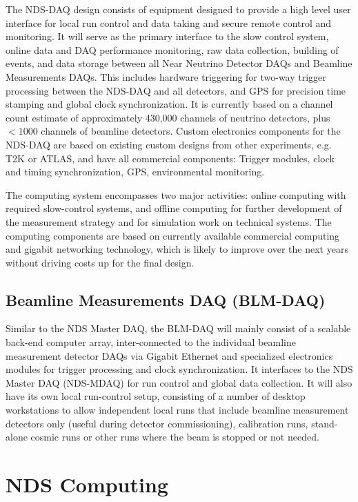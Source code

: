 The NDS-DAQ design consists of equipment designed to provide a high level user interface 
for local run control and data taking and secure remote control and monitoring.   It will 
serve as the primary interface to the slow control system, online data and DAQ performance 
monitoring, raw data collection, building of events, and data storage between all Near 
Neutrino Detector DAQs and Beamline Measurements DAQs.  This includes hardware triggering 
for two-way trigger processing between the NDS-DAQ and all detectors, and GPS for precision 
time stamping and global clock synchronization.  It is currently based on a channel count 
estimate of approximately 430,000 channels of neutrino detectors, plus $<1000$ channels of 
beamline detectors.  Custom electronics components for the NDS-DAQ are based on existing 
custom designs from other experiments, e.g. T2K or ATLAS, and have all commercial 
components:  Trigger modules, clock and timing synchronization, GPS, environmental 
monitoring.

The computing system encompasses two major activities: online computing with required 
slow-control systems, and offline computing for further development of the measurement 
strategy and for simulation work on technical systems. The computing components are based 
on currently available commercial computing and gigabit networking technology, which is 
likely to improve over the next years without driving costs up for the final design.  

\subsection{Beamline Measurements DAQ (BLM-DAQ)}

Similar to the NDS Master DAQ, the BLM-DAQ will mainly consist of a scalable back-end 
computer array, inter-connected to the individual beamline measurement detector DAQs via 
Gigabit Ethernet and specialized electronics modules for trigger processing and clock 
synchronization. It interfaces to the NDS Master DAQ (NDS-MDAQ) for run control and global 
data collection. It will also have its own local run-control setup, consisting of a number 
of desktop workstations to allow independent local runs that include beamline measurement 
detectors only (useful during detector commissioning), calibration runs, stand-alone cosmic 
runs or other runs where the beam is stopped or not needed.


\section{NDS Computing}
\label{sec:nd-gdaq-global-computing}

